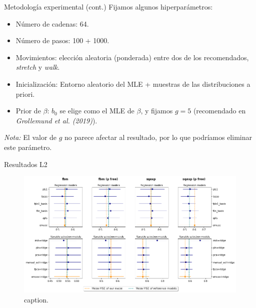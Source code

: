 \documentclass[10pt, english, professionalfonts]{beamer}
\begin{document}
\begin{frame}{Metodología experimental (cont.)}
  Fijamos algunos hiperparámetros:
  \begin{itemize}
    \item Número de cadenas: 64.
    \item Número de pasos: 100 + 1000.
    \item Movimientos: elección aleatoria (ponderada) entre dos de los recomendados, \textit{stretch} y \textit{walk}.
    \item Inicialización: Entorno aleatorio del MLE + muestras de las distribuciones a priori.
    \item Prior de \(\beta\): \(b_0\) se elige como el MLE de \(\beta\), y fijamos \(g=5\) (recomendado en \textit{Grollemund et al. (2019)}).
  \end{itemize}
  \vspace{1em}

  \textit{Nota:} El valor de \(g\) no parece afectar al resultado, por lo que podríamos eliminar este parámetro.
\end{frame}

\begin{frame}{Resultados L2}
  \begin{figure}
    \includegraphics[width=\textwidth]{img/reg_emcee_l2}
    \caption{caption.}
  \end{figure}
\end{frame}
\end{document}
